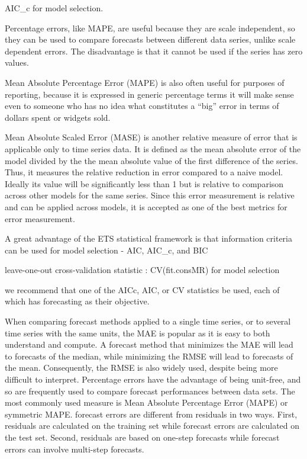 \documentclass[]{book}
\begin{document}
AIC\_c for model selection.

Percentage errors, like MAPE, are useful because they are scale
independent, so they can be used to compare forecasts between different
data series, unlike scale dependent errors. The disadvantage is that it
cannot be used if the series has zero values.

Mean Absolute Percentage Error (MAPE) is also often useful for purposes
of reporting, because it is expressed in generic percentage terms it
will make sense even to someone who has no idea what constitutes a
``big'' error in terms of dollars spent or widgets sold.

Mean Absolute Scaled Error (MASE) is another relative measure of error
that is applicable only to time series data. It is defined as the mean
absolute error of the model divided by the the mean absolute value of
the first difference of the series. Thus, it measures the relative
reduction in error compared to a naive model. Ideally its value will be
significantly less than 1 but is relative to comparison across other
models for the same series. Since this error measurement is relative and
can be applied across models, it is accepted as one of the best metrics
for error measurement.

A great advantage of the ETS statistical framework is that information
criteria can be used for model selection - AIC, AIC\_c, and BIC

leave-one-out cross-validation statistic : CV(fit.consMR) for model
selection

we recommend that one of the AICc, AIC, or CV statistics be used, each
of which has forecasting as their objective.

When comparing forecast methods applied to a single time series, or to
several time series with the same units, the MAE is popular as it is
easy to both understand and compute. A forecast method that minimizes
the MAE will lead to forecasts of the median, while minimizing the RMSE
will lead to forecasts of the mean. Consequently, the RMSE is also
widely used, despite being more difficult to interpret. Percentage
errors have the advantage of being unit-free, and so are frequently used
to compare forecast performances between data sets. The most commonly
used measure is Mean Absolute Percentage Error (MAPE) or symmetric MAPE.
forecast errors are different from residuals in two ways. First,
residuals are calculated on the training set while forecast errors are
calculated on the test set. Second, residuals are based on one-step
forecasts while forecast errors can involve multi-step forecasts.
\end{document}
